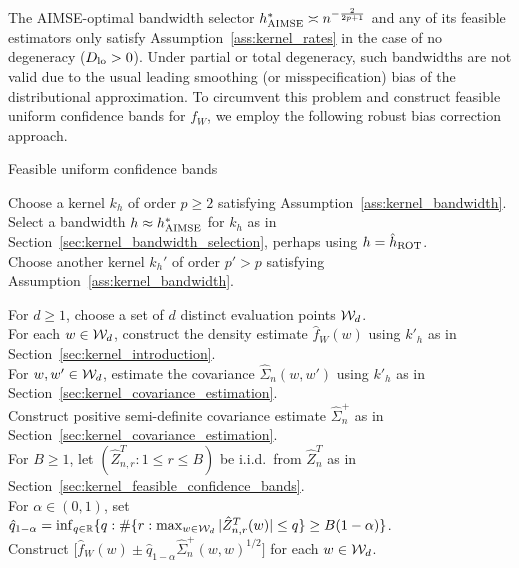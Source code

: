 The AIMSE-optimal bandwidth selector $h^*_{\operatorname{AIMSE}}\asymp n^{-\frac{2}{2p+1}}$
and any of its feasible estimators only satisfy
Assumption~\ref{ass:kernel_rates} in
the case of no degeneracy ($D_{\textup{lo}}>0$). Under partial or total degeneracy, such
bandwidths are not valid due to the usual leading smoothing (or
misspecification) bias of the distributional approximation. To circumvent this
problem and construct feasible uniform confidence bands for $f_W$, we employ
the following robust bias correction approach.

\begin{algorithm}[t]
  \caption{Feasible uniform confidence bands}
  \label{alg:kernel_method}

  Choose a kernel $k_h$ of order $p \geq 2$ satisfying
  Assumption~\ref{ass:kernel_bandwidth}. \\

  Select a bandwidth $h \approx h^*_{\operatorname{AIMSE}}$ for $k_h$
  as in Section~\ref{sec:kernel_bandwidth_selection},
  perhaps using $h = \hat{h}_{\operatorname{ROT}}$. \\

  Choose another kernel $k_h'$ of order $p'>p$ satisfying
  Assumption~\ref{ass:kernel_bandwidth}.

  For $d \geq 1$, choose a set of $d$ distinct evaluation points $\mathcal{W}_d$. \\

  For each $w \in \mathcal{W}_d$, construct the density estimate $\hat f_W(w)$
  using $k'_{h}$ as in Section~\ref{sec:kernel_introduction}. \\

  For $w, w' \in \mathcal{W}_d$, estimate the covariance $\hat \Sigma_n(w,w')$
  using $k'_{h}$ as in Section~\ref{sec:kernel_covariance_estimation}. \\

  Construct positive semi-definite
  covariance estimate $\hat \Sigma_n^+$
  as in Section~\ref{sec:kernel_covariance_estimation}. \\

  For $B \geq 1$, let $(\hat Z_{n,r}^T: 1\leq r\leq B)$ be i.i.d.\
  from $\hat{Z}_n^T$ as in Section~\ref{sec:kernel_feasible_confidence_bands}.
  \\

  For $\alpha \in (0,1)$, set
  $\hat q_{1-\alpha} = \inf_{q \in \mathbb{R}}
  \{ q : \# \{r: \max_{w\in\mathcal{W}_d}|\hat Z_{n,r}^T(w)| \leq q \}
  \geq B(1-\alpha) \}$. \\

  Construct $ \big[\hat f_W(w) \pm
  \hat q_{1-\alpha} \hat\Sigma_n^+(w,w)^{1/2} \big]$ for each $w \in \mathcal{W}_d$.
\end{algorithm}

